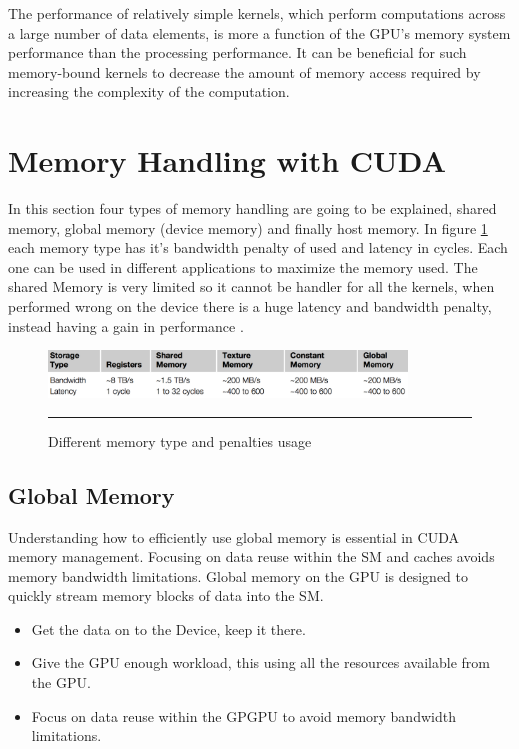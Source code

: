 The performance of relatively simple kernels, which perform computations across a large number of data elements, is more a function of the GPU's memory system performance than the processing performance. It can be beneficial for such memory-bound kernels to decrease the amount of memory access required by increasing the complexity of the computation. \cite{cook}

\section{Memory Handling with CUDA}

In this section four types of memory handling are going to be explained, shared memory, global memory (device memory) and finally host memory. In figure \ref{fig:memory} each memory type has it's bandwidth penalty of used and latency in cycles. Each one can be used in different applications to maximize the memory used. The shared Memory is very limited so it cannot be handler for all the kernels, when performed wrong on the device there is a huge latency and bandwidth penalty, instead having a gain in performance \cite{cook}.

\begin{figure}[htbp]
	\centering
		\includegraphics[width=0.85\textwidth]{Figures/memory.png}
		\rule{35em}{0.5pt}
	\caption[Different memory types]{Different memory type and penalties usage}
	\label{fig:memory}
\end{figure}


\subsection{Global Memory}


Understanding how to efficiently use global memory is essential in CUDA memory management.
Focusing on data reuse within the SM and caches avoids memory bandwidth limitations. Global memory on the GPU is designed to quickly stream memory blocks of data into the SM.  

\begin{itemize}
\item Get the data on to the Device, keep it there.
\item Give the GPU enough workload, this using all the resources available from the GPU.
\item Focus on data reuse within the GPGPU to avoid memory bandwidth limitations.
\end{itemize}

